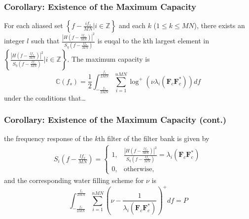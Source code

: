 \documentclass{beamer}
\begin{document}
\begin{frame}
\frametitle{Corollary: Existence of the Maximum Capacity}
\begin{block}{}
  For each aliased set $\left\{f-\frac{if_s}{MN}|i\in\mathbb{Z}\right\}$ and each $k$ ($1\leq k\leq MN$), there exists an integer $l$ such that $\frac{|H(f-\frac{lf_s}{MN})|^2}{S_\eta(f-\frac{lf_s}{MN})}$ is euqal to the kth largest element in $\left\{\frac{|H(f-\frac{lf_s}{MN})|^2}{S_\eta(f-\frac{lf_s}{MN})} | i\in\mathbb{Z}\right\}$. The maximum capacity is
  \begin{equation}
    \mathbb{C}(f_s)  =\frac{1}{2}\int_{-\frac{f_s}{2MN}}^{\frac{f_s}{2MN}}\sum_{i=1}^{nMN}\log^+\left(\nu\lambda_i\left(\pmb{F}_{c}\pmb{F}_{c}^*\right)\right)df
  \end{equation}
  under the conditions that\dots
\end{block}
\end{frame}

\begin{frame}
\frametitle{Corollary: Existence of the Maximum Capacity (cont.)}
\begin{block}{}
  the frequency response of the $k$th filter of the filter bank is given by
  \begin{align}
    S_i\left(f-\frac{lf_s}{MN}\right) = \begin{cases} 1,& \frac{|H(f-\frac{lf_s}{MN})|^2}{S_\eta(f-\frac{lf_s}{MN})}=\lambda_i\left(\pmb{F}_{c}\pmb{F}_{c}^*\right) \\
      0,& \mbox{otherwise,} \end{cases}
  \end{align}
  and the corresponding water filling scheme for $\nu$ is
  \begin{equation}
    \int_{-\frac{f_s}{2MN}}^{\frac{f_s}{2MN}}\sum_{i=1}^{nMN}\left(\nu - \frac{1}{\lambda_i\left(\pmb{F}_{c}\pmb{F}_{c}^*\right)}\right)^+df = P
  \end{equation}
\end{block}
\end{frame}

%
%
%
\end{document}
